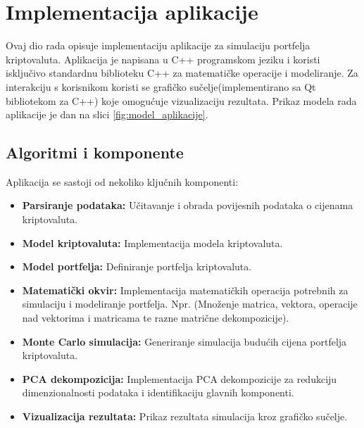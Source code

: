\documentclass[zavrsnirad]{fer}
\begin{document}
\chapter{Implementacija aplikacije}
\label{pog:implementacija}
Ovaj dio rada opisuje implementaciju aplikacije za simulaciju
portfelja kriptovaluta. Aplikacija je napisana u C++ programskom
jeziku i koristi isključivo standardnu biblioteku C++ za matematičke
operacije i modeliranje. Za interakciju s korisnikom koristi se
grafičko sučelje(implementirano sa Qt bibliotekom za C++) koje
omogućuje vizualizaciju rezultata. Prikaz modela rada aplikacije
je dan na slici \ref{fig:model_aplikacije}.
\\

\section{Algoritmi i komponente}
\label{sek:algoritmi_i_komponente}
Aplikacija se sastoji od nekoliko ključnih komponenti:
\begin{itemize}
    \item \textbf{Parsiranje podataka:} Učitavanje i obrada povijesnih
    podataka o cijenama kriptovaluta.

    \item \textbf{Model kriptovaluta:} Implementacija modela kriptovaluta.

    \item \textbf{Model portfelja:} Definiranje portfelja kriptovaluta.

    \item \textbf{Matematički okvir:} Implementacija matematičkih
    operacija potrebnih za simulaciju i modeliranje portfelja. Npr.
        (Množenje matrica, vektora, operacije nad vektorima i matricama te
        razne matrične dekompozicije).

    \item \textbf{Monte Carlo simulacija:} Generiranje simulacija
    budućih cijena portfelja kriptovaluta.

    \item \textbf{PCA dekompozicija:} Implementacija PCA dekompozicije
    za redukciju dimenzionalnosti podataka i identifikaciju glavnih
    komponenti.

    \item \textbf{Vizualizacija rezultata:} Prikaz rezultata simulacija
    kroz grafičko sučelje.
\end{itemize}
\end{document}
